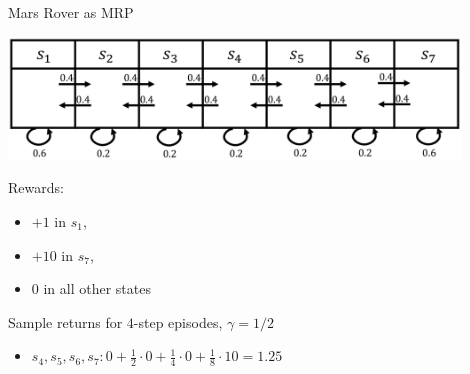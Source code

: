 \begin{frame}[c]{Mars Rover as MRP}
	
	\begin{center}
		\includegraphics[width=0.9\textwidth]{images/mars_rover_markov_process_2.png}
	\end{center}
	
	Rewards:
	\begin{itemize}
		\item $+1$ in $s_1$, 
		\item $+10$ in $s_7$,
		\item $0$ in all other states
	\end{itemize}
	
	Sample returns for $4$-step episodes, $\gamma=1/2$
	\begin{itemize}
		\item $s_4,s_5,s_6,s_7: 0 + \frac{1}{2}\cdot 0 + \frac{1}{4}\cdot 0 + \frac{1}{8}\cdot 10 = 1.25$
	\end{itemize}
	
\end{frame}

